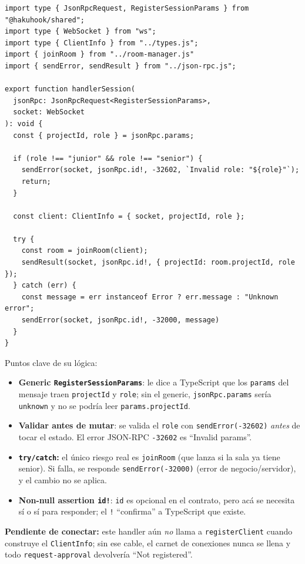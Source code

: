 \documentclass[11pt,a4paper]{article}
\begin{document}
\begin{lstlisting}[caption=packages/gateway-hub/src/handlers/register-session.ts]
import type { JsonRpcRequest, RegisterSessionParams } from "@hakuhook/shared";
import type { WebSocket } from "ws";
import type { ClientInfo } from "../types.js";
import { joinRoom } from "../room-manager.js"
import { sendError, sendResult } from "../json-rpc.js";

export function handlerSession(
  jsonRpc: JsonRpcRequest<RegisterSessionParams>,
  socket: WebSocket
): void {
  const { projectId, role } = jsonRpc.params;

  if (role !== "junior" && role !== "senior") {
    sendError(socket, jsonRpc.id!, -32602, `Invalid role: "${role}"`);
    return;
  }

  const client: ClientInfo = { socket, projectId, role };

  try {
    const room = joinRoom(client);
    sendResult(socket, jsonRpc.id!, { projectId: room.projectId, role });
  } catch (err) {
    const message = err instanceof Error ? err.message : "Unknown error";
    sendError(socket, jsonRpc.id!, -32000, message)
  }
}
\end{lstlisting}

Puntos clave de su lógica:

\begin{itemize}
  \item \textbf{Generic \texttt{RegisterSessionParams}}: le dice a TypeScript que
        los \texttt{params} del mensaje traen \texttt{projectId} y \texttt{role};
        sin el generic, \texttt{jsonRpc.params} sería \texttt{unknown} y no se
        podría leer \texttt{params.projectId}.
  \item \textbf{Validar antes de mutar}: se valida el \texttt{role} con
        \texttt{sendError(-32602)} \emph{antes} de tocar el estado. El error
        JSON-RPC \texttt{-32602} es ``Invalid params''.
  \item \textbf{\texttt{try/catch}:} el único riesgo real es \texttt{joinRoom}
        (que lanza si la sala ya tiene senior). Si falla, se responde
        \texttt{sendError(-32000)} (error de negocio/servidor), y el cambio no
        se aplica.
  \item \textbf{Non-null assertion \texttt{id!}}: \texttt{id} es opcional en el
        contrato, pero acá se necesita sí o sí para responder; el \texttt{!}
        ``confirma'' a TypeScript que existe.
\end{itemize}

\textbf{Pendiente de conectar:} este handler aún \emph{no} llama a
\texttt{registerClient} cuando construye el \texttt{ClientInfo}; sin ese cable,
el carnet de conexiones nunca se llena y todo \texttt{request-approval}
devolvería ``Not registered''.
\end{document}
